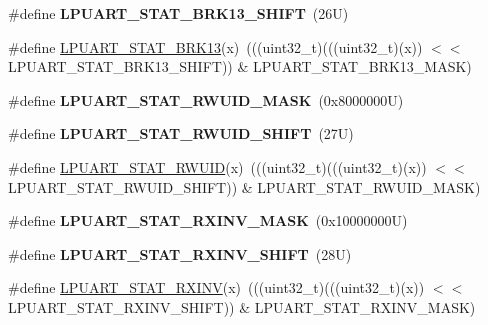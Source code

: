 \begin{DoxyCompactItemize}
\#define {\bfseries L\+P\+U\+A\+R\+T\+\_\+\+S\+T\+A\+T\+\_\+\+B\+R\+K13\+\_\+\+S\+H\+I\+FT}~(26\+U)
\item 
\#define \mbox{\hyperlink{group___l_p_u_a_r_t___register___masks_ga72eee8e71bb38670c47cfb5f02e290a0}{L\+P\+U\+A\+R\+T\+\_\+\+S\+T\+A\+T\+\_\+\+B\+R\+K13}}(x)~(((uint32\+\_\+t)(((uint32\+\_\+t)(x)) $<$$<$ L\+P\+U\+A\+R\+T\+\_\+\+S\+T\+A\+T\+\_\+\+B\+R\+K13\+\_\+\+S\+H\+I\+FT)) \& L\+P\+U\+A\+R\+T\+\_\+\+S\+T\+A\+T\+\_\+\+B\+R\+K13\+\_\+\+M\+A\+SK)
\item 
\mbox{\label{group___l_p_u_a_r_t___register___masks_gaf91fe72606540f8db9cec0634f026f2b}} 
\#define {\bfseries L\+P\+U\+A\+R\+T\+\_\+\+S\+T\+A\+T\+\_\+\+R\+W\+U\+I\+D\+\_\+\+M\+A\+SK}~(0x8000000\+U)
\item 
\mbox{\label{group___l_p_u_a_r_t___register___masks_gab51aed4d5798683bda04d4706dfe561e}} 
\#define {\bfseries L\+P\+U\+A\+R\+T\+\_\+\+S\+T\+A\+T\+\_\+\+R\+W\+U\+I\+D\+\_\+\+S\+H\+I\+FT}~(27\+U)
\item 
\#define \mbox{\hyperlink{group___l_p_u_a_r_t___register___masks_ga87701a48aa4fa693bf9ce219cbd6ac49}{L\+P\+U\+A\+R\+T\+\_\+\+S\+T\+A\+T\+\_\+\+R\+W\+U\+ID}}(x)~(((uint32\+\_\+t)(((uint32\+\_\+t)(x)) $<$$<$ L\+P\+U\+A\+R\+T\+\_\+\+S\+T\+A\+T\+\_\+\+R\+W\+U\+I\+D\+\_\+\+S\+H\+I\+FT)) \& L\+P\+U\+A\+R\+T\+\_\+\+S\+T\+A\+T\+\_\+\+R\+W\+U\+I\+D\+\_\+\+M\+A\+SK)
\item 
\mbox{\label{group___l_p_u_a_r_t___register___masks_ga68ec887f10942a419fab1203a82b887c}} 
\#define {\bfseries L\+P\+U\+A\+R\+T\+\_\+\+S\+T\+A\+T\+\_\+\+R\+X\+I\+N\+V\+\_\+\+M\+A\+SK}~(0x10000000\+U)
\item 
\mbox{\label{group___l_p_u_a_r_t___register___masks_gac6c1fb6dfc8a7c467ff1fc245d1d9658}} 
\#define {\bfseries L\+P\+U\+A\+R\+T\+\_\+\+S\+T\+A\+T\+\_\+\+R\+X\+I\+N\+V\+\_\+\+S\+H\+I\+FT}~(28\+U)
\item 
\#define \mbox{\hyperlink{group___l_p_u_a_r_t___register___masks_gac6138d9c077e761c13a4c71115ddf223}{L\+P\+U\+A\+R\+T\+\_\+\+S\+T\+A\+T\+\_\+\+R\+X\+I\+NV}}(x)~(((uint32\+\_\+t)(((uint32\+\_\+t)(x)) $<$$<$ L\+P\+U\+A\+R\+T\+\_\+\+S\+T\+A\+T\+\_\+\+R\+X\+I\+N\+V\+\_\+\+S\+H\+I\+FT)) \& L\+P\+U\+A\+R\+T\+\_\+\+S\+T\+A\+T\+\_\+\+R\+X\+I\+N\+V\+\_\+\+M\+A\+SK)
$$
\end{DoxyCompactItemize}
